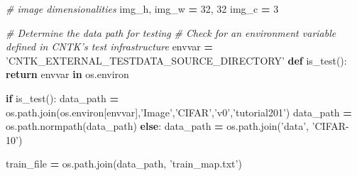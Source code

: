 \documentclass[]{book}
\newenvironment{Shaded}{\begin{snugshade}}{\end{snugshade}}
\newcommand{\KeywordTok}[1]{\textcolor[rgb]{0.13,0.29,0.53}{\textbf{#1}}}
\newcommand{\DecValTok}[1]{\textcolor[rgb]{0.00,0.00,0.81}{#1}}
\newcommand{\StringTok}[1]{\textcolor[rgb]{0.31,0.60,0.02}{#1}}
\newcommand{\CommentTok}[1]{\textcolor[rgb]{0.56,0.35,0.01}{\textit{#1}}}
\newcommand{\ControlFlowTok}[1]{\textcolor[rgb]{0.13,0.29,0.53}{\textbf{#1}}}
\newcommand{\OperatorTok}[1]{\textcolor[rgb]{0.81,0.36,0.00}{\textbf{#1}}}
\newcommand{\NormalTok}[1]{#1}
\theoremstyle{definition}
\theoremstyle{definition}
\theoremstyle{definition}
\theoremstyle{remark}
\begin{document}
\begin{Shaded}
\begin{Highlighting}[]
\CommentTok{# image dimensionalities}
\NormalTok{img_h, img_w }\OperatorTok{=} \DecValTok{32}\NormalTok{, }\DecValTok{32}
\NormalTok{img_c }\OperatorTok{=} \DecValTok{3}
\end{Highlighting}
\end{Shaded}

\begin{Shaded}
\begin{Highlighting}[]
\CommentTok{# Determine the data path for testing}
\CommentTok{# Check for an environment variable defined in CNTK's test infrastructure}
\NormalTok{envvar }\OperatorTok{=} \StringTok{'CNTK_EXTERNAL_TESTDATA_SOURCE_DIRECTORY'}
\KeywordTok{def}\NormalTok{ is_test(): }\ControlFlowTok{return}\NormalTok{ envvar }\KeywordTok{in}\NormalTok{ os.environ}

\ControlFlowTok{if}\NormalTok{ is_test():}
\NormalTok{    data_path }\OperatorTok{=}\NormalTok{ os.path.join(os.environ[envvar],}\StringTok{'Image'}\NormalTok{,}\StringTok{'CIFAR'}\NormalTok{,}\StringTok{'v0'}\NormalTok{,}\StringTok{'tutorial201'}\NormalTok{)}
\NormalTok{    data_path }\OperatorTok{=}\NormalTok{ os.path.normpath(data_path)}
\ControlFlowTok{else}\NormalTok{:}
\NormalTok{    data_path }\OperatorTok{=}\NormalTok{ os.path.join(}\StringTok{'data'}\NormalTok{, }\StringTok{'CIFAR-10'}\NormalTok{)}
    
\NormalTok{train_file }\OperatorTok{=}\NormalTok{ os.path.join(data_path, }\StringTok{'train_map.txt'}\NormalTok{)}
\end{Highlighting}
\end{Shaded}
\end{document}
